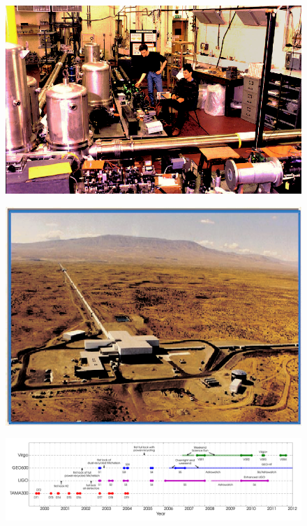 \documentclass{article}
\begin{document}
\begin{figure}[]
\begin{center}
\includegraphics[width=1\columnwidth]{./figures/figpro/figpro}
\caption{ \protect}
\end{center}
\end{figure}


\begin{figure}[]
\begin{center}
\includegraphics[width=1\columnwidth]{./figures/fig7/fig7}
\caption{ \protect}
\end{center}
\end{figure}


\begin{figure}[]
\begin{center}
\includegraphics[width=1\columnwidth]{./figures/runtimes/runtimes}
\caption{ \protect}
\end{center}
\end{figure}
\end{document}

